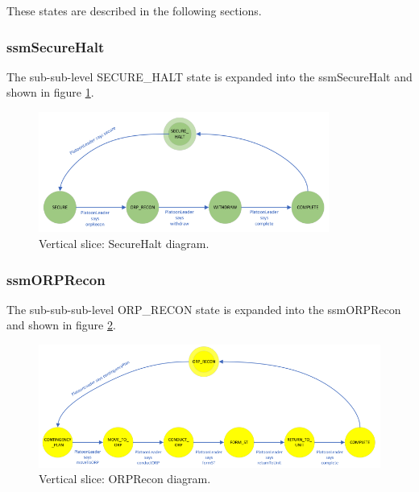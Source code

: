 \documentclass[../../main/main.tex]{subfiles}
\begin{document}
These states are described in the following sections.
\subsubsection{ssmSecureHalt}\label{sssec:ssmSecureHalt}
The sub-sub-level SECURE_HALT state is expanded into the ssmSecureHalt  and shown in figure \ref{ssmSecurtHaltDiagram}.

\begin{figure}[h!]
\centering
\includegraphics[width=0.85\textwidth]{../figures/ssmSecurtHaltDiagram}
\caption{\label{ssmSecurtHaltDiagram} Vertical slice: SecureHalt diagram.}
\end{figure}
\clearpage

\subsubsection{ssmORPRecon}\label{sssec:ssmORPRecon}
The sub-sub-sub-level ORP_RECON state is expanded into the ssmORPRecon  and shown in figure \ref{ssmORPReconDiagram}.

\begin{figure}[h!]
\centering
\includegraphics[width=\textwidth]{../figures/ssmORPReconDiagram}
\caption{\label{ssmORPReconDiagram} Vertical slice: ORPRecon diagram.}
\end{figure}
\clearpage
\end{document}
